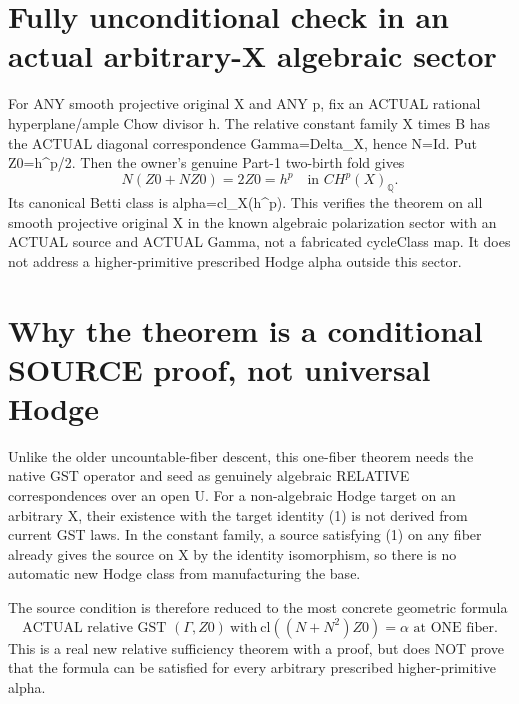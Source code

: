 \documentclass[11pt]{article}
\begin{document}
\section{Fully unconditional check in an actual arbitrary-X algebraic sector}
For ANY smooth projective original X and ANY p,
fix an ACTUAL rational hyperplane/ample Chow divisor h.
The relative constant family X times B has the
ACTUAL diagonal correspondence Gamma=Delta_X,
hence N=Id. Put Z0=h^p/2.
Then the owner's genuine Part-1 two-birth fold gives
\[
N(Z0+NZ0)=2Z0=h^p
\quad\text{in }CH^p(X)_{\mathbb Q}.
\]
Its canonical Betti class is alpha=cl_X(h^p).
This verifies the theorem on all smooth projective
original X in the known algebraic polarization
sector with an ACTUAL source and ACTUAL Gamma,
not a fabricated cycleClass map.
It does not address a higher-primitive
prescribed Hodge alpha outside this sector.

\section{Why the theorem is a conditional SOURCE proof, not universal Hodge}
Unlike the older uncountable-fiber descent,
this one-fiber theorem needs the native GST
operator and seed as genuinely algebraic
RELATIVE correspondences over an open U.
For a non-algebraic Hodge target on an arbitrary
X, their existence with the target identity
(1) is not derived from current GST laws.
In the constant family, a source satisfying
(1) on any fiber already gives the source
on X by the identity isomorphism, so there
is no automatic new Hodge class from
manufacturing the base.

The source condition is therefore reduced
to the most concrete geometric formula
\[
\boxed{
\text{ACTUAL relative GST }(\Gamma,Z0)
\ \text{with}\ 
\mathrm{cl}((N+N^2)Z0)=\alpha
\text{ at ONE fiber}.
}
\]
This is a real new relative sufficiency theorem
with a proof, but does NOT prove that the
formula can be satisfied for every
arbitrary prescribed higher-primitive alpha.
\end{document}
